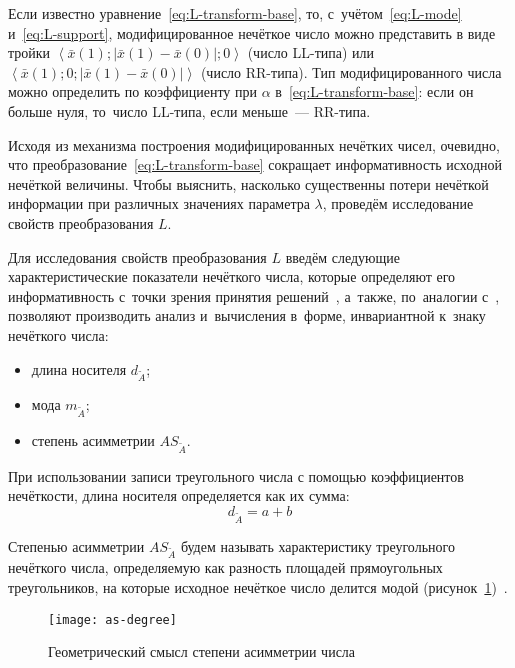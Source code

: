 Если известно уравнение~\eqref{eq:L-transform-base}, то, с~учётом~\eqref{eq:L-mode} и~\eqref{eq:L-support}, модифицированное нечёткое число можно представить в виде тройки $\displaystyle \left\langle \bar{x}\left( 1 \right);\left| \bar{x}\left( 1 \right)-\bar{x}\left( 0 \right) \right|;0 \right\rangle$ (число LL-типа) или $\displaystyle \left\langle \bar{x}\left( 1 \right);0;\left| \bar{x}\left( 1 \right)-\bar{x}\left( 0 \right) \right| \right\rangle$ (число RR-типа). Тип модифицированного числа можно определить по коэффициенту при $\alpha$ в~\eqref{eq:L-transform-base}: если он больше нуля, то~число LL-типа, если меньше~--- RR-типа.

Исходя из механизма построения модифицированных нечётких чисел, очевидно, что преобразование~\eqref{eq:L-transform-base} сокращает информативность исходной нечёткой величины. Чтобы выяснить, насколько существенны потери нечёткой информации при различных значениях параметра $\lambda$, проведём исследование свойств преобразования $L$.

Для исследования свойств преобразования $L$ введём следующие характеристические показатели нечёткого числа, которые определяют его информативность с~точки зрения принятия решений~\cite{VSU-1, Alushta-1}, а~также, по~аналогии с~\cite{Spesivtsev}, позволяют производить анализ и~вычисления в~форме, инвариантной к~знаку нечёткого числа:
\begin{itemize}
  \item длина носителя $d_{\tilde A}$;
  \item мода $m_{\tilde A}$;
  \item степень асимметрии $AS_{\tilde A}$.
\end{itemize}

При использовании записи треугольного числа с помощью коэффициентов нечёткости, длина носителя определяется как их сумма:
\begin{equation}
\label{eq:support-length}
  d_{\tilde A}=a+b
\end{equation}

\begin{mydef}
  Степенью асимметрии $AS_{\tilde A}$ будем называть характеристику треугольного нечёткого числа, определяемую как разность площадей прямоугольных треугольников, на которые исходное нечёткое число делится модой (рисунок~\ref{fig:as-degree})~\cite{VSU-1}.
\end{mydef}
\begin{figure}[h!]
  \centering
  {
    \texttt{[image: as-degree]}
    \caption{Геометрический смысл степени асимметрии числа}
    \label{fig:as-degree}
  }
\end{figure}


